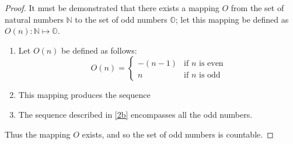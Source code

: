 \begin{proof}
	It must be demonstrated that there exists a mapping $ O $ from the set of natural numbers $\mathbb{N}$ to the set of odd numbers $ \mathbb{O} $; let this mapping be defined as $ O(n) : \mathbb{N} \mapsto \mathbb{O} $.
	\begin{enumerate}[label=\textbf{\Roman*}]
		\item Let $ O(n) $ be defined as follows: \[ O(n) = \begin{cases} -(n-1) & \text{if } n \text{ is even} \\ n & \text{if } n \text{ is odd} \end{cases} \]
		\item \label{2b} This mapping produces the sequence 
		\item The sequence described in \ref{2b} encompasses all the odd numbers.
	\end{enumerate}
	Thus the mapping $ O $ exists, and so the set of odd numbers is countable.
\end{proof}